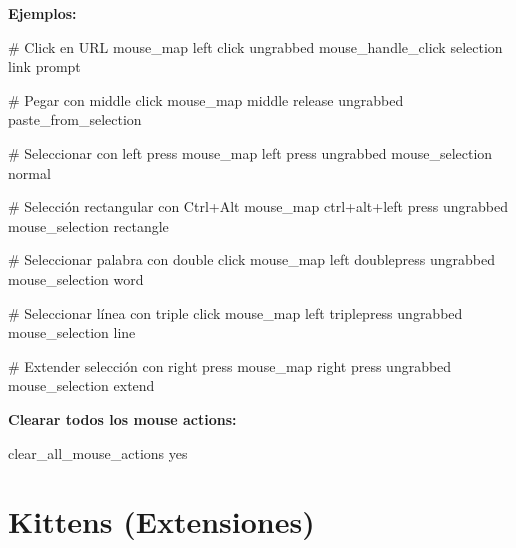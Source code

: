 \documentclass[
  doc,
  floatsintext,
  longtable,
  a4paper,
  nolmodern,
  notxfonts,
  notimes,
  12pt,
  colorlinks=true,linkcolor=blue,citecolor=blue,urlcolor=blue]{apa7}
\newenvironment{Shaded}{\begin{snugshade}}{\end{snugshade}}
\newcommand{\CommentTok}[1]{\textcolor[rgb]{0.37,0.37,0.37}{#1}}
\newcommand{\DataTypeTok}[1]{\textcolor[rgb]{0.68,0.00,0.00}{#1}}
\newcommand{\ErrorTok}[1]{\textcolor[rgb]{0.68,0.00,0.00}{#1}}
\begin{document}
\textbf{Ejemplos:}

\begin{Shaded}
\begin{Highlighting}[]
\CommentTok{\# Click en URL}
\DataTypeTok{mouse\_map} \DataTypeTok{left} \DataTypeTok{click} \DataTypeTok{ungrabbed} \DataTypeTok{mouse\_handle\_click} \DataTypeTok{selection} \DataTypeTok{link} \DataTypeTok{prompt}

\CommentTok{\# Pegar con middle click}
\DataTypeTok{mouse\_map} \DataTypeTok{middle} \DataTypeTok{release} \DataTypeTok{ungrabbed} \DataTypeTok{paste\_from\_selection}

\CommentTok{\# Seleccionar con left press}
\DataTypeTok{mouse\_map} \DataTypeTok{left} \DataTypeTok{press} \DataTypeTok{ungrabbed} \DataTypeTok{mouse\_selection} \DataTypeTok{normal}

\CommentTok{\# Selección rectangular con Ctrl+Alt}
\DataTypeTok{mouse\_map} \DataTypeTok{ctrl}\ErrorTok{+}\DataTypeTok{alt}\ErrorTok{+}\DataTypeTok{left} \DataTypeTok{press} \DataTypeTok{ungrabbed} \DataTypeTok{mouse\_selection} \DataTypeTok{rectangle}

\CommentTok{\# Seleccionar palabra con double click}
\DataTypeTok{mouse\_map} \DataTypeTok{left} \DataTypeTok{doublepress} \DataTypeTok{ungrabbed} \DataTypeTok{mouse\_selection} \DataTypeTok{word}

\CommentTok{\# Seleccionar línea con triple click}
\DataTypeTok{mouse\_map} \DataTypeTok{left} \DataTypeTok{triplepress} \DataTypeTok{ungrabbed} \DataTypeTok{mouse\_selection} \DataTypeTok{line}

\CommentTok{\# Extender selección con right press}
\DataTypeTok{mouse\_map} \DataTypeTok{right} \DataTypeTok{press} \DataTypeTok{ungrabbed} \DataTypeTok{mouse\_selection} \DataTypeTok{extend}
\end{Highlighting}
\end{Shaded}

\textbf{Clearar todos los mouse actions:}

\begin{Shaded}
\begin{Highlighting}[]
\DataTypeTok{clear\_all\_mouse\_actions} \DataTypeTok{yes}
\end{Highlighting}
\end{Shaded}

\section{Kittens (Extensiones)}\label{kittens-extensiones}
\end{document}
